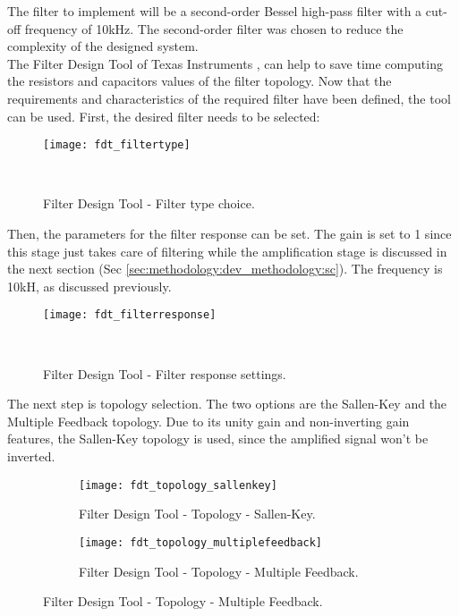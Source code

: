 The filter to implement will be a second-order Bessel high-pass filter with a cut-off frequency of 10kHz. The second-order filter was chosen to reduce the complexity of the designed system. \\

The Filter Design Tool of Texas Instruments \cite{fdt}, can help to save time computing the resistors and capacitors values of the filter topology. Now that the requirements and characteristics of the required filter have been defined, the tool can be used. First, the desired filter needs to be selected:

\begin{figure}[H]
    \centering
    \texttt{[image: fdt\_filtertype]}
    \caption{Filter Design Tool - Filter type choice.}
~\label{fig:fdt_filtertype}
\end{figure}

Then, the parameters for the filter response can be set. The gain is set to 1 since this stage just takes care of filtering while the amplification stage is discussed in the next section (Sec \ref{sec:methodology:dev_methodology:sc}). The frequency is 10kH, as discussed previously.

\begin{figure}[H]
    \centering
    \texttt{[image: fdt\_filterresponse]}
    \caption{Filter Design Tool - Filter response settings.}
~\label{fig:fdt_filterresponse}
\end{figure}

The next step is topology selection. The two options are the Sallen-Key and the Multiple Feedback topology. Due to its unity gain and non-inverting gain features, the Sallen-Key topology is used, since the amplified signal won't be inverted.

\begin{figure}[H]
    \centering
    \begin{subfigure}[t]{1\textwidth}
        \centering
        \texttt{[image: fdt\_topology\_sallenkey]}
        \caption{Filter Design Tool - Topology - Sallen-Key.}
        \label{fig:fdt_topology:sallen-key}
    \end{subfigure}
    \begin{subfigure}[t]{1\textwidth}
        \centering
        \texttt{[image: fdt\_topology\_multiplefeedback]}
        \caption{Filter Design Tool - Topology - Multiple Feedback.}
        \label{fig:fdt_topology:multiple_feedback}
    \end{subfigure}
\end{figure}

